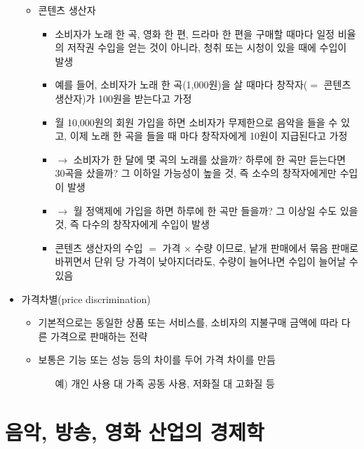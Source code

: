 \begin{itemize}
\begin{itemize}
	\item 콘텐츠 생산자
		\begin{itemize}
		\item 소비자가 노래 한 곡, 영화 한 편, 드라마 한 편을 구매할 때마다 일정 비율의 저작권 수입을 얻는 것이 아니라, 청취 또는 시청이 있을 때에 수입이 발생
		\item 예를 들어, 소비자가 노래 한 곡(1,000원)을 살 때마다 창작자($=$ 콘텐츠 생산자)가 100원을 받는다고 가정
		\item 월 10,000원의 회원 가입을 하면 소비자가 무제한으로 음악을 들을 수 있고, 이제 노래 한 곡을 들을 때 마다 창작자에게 10원이 지급된다고 가정
		\item $\rightarrow$ 소비자가 한 달에 몇 곡의 노래를 샀을까? 하루에 한 곡만 듣는다면 30곡을 샀을까? 그 이하일 가능성이 높을 것, 즉 소수의 창작자에게만 수입이 발생
		\item $\rightarrow$ 월 정액제에 가입을 하면 하루에 한 곡만 들을까? 그 이상일 수도 있을 것, 즉 다수의 창작자에게 수입이 발생
		\item 콘텐츠 생산자의 수입 $=$ 가격 $\times$ 수량 이므로, 낱개 판매에서 묶음 판매로 바뀌면서 단위 당 가격이 낮아지더라도, 수량이 늘어나면 수입이 늘어날 수 있음
		\end{itemize}
	\end{itemize}	
\item 가격차별(price discrimination)
	\begin{itemize}
	\item 기본적으로는 동일한 상품 또는 서비스를, 소비자의 지불구매 금액에 따라 다른 가격으로 판매하는 전략
	\item 보통은 기능 또는 성능 등의 차이를 두어 가격 차이를 만듬
		\begin{itemize}
		\item[예)] 개인 사용 대 가족 공동 사용, 저화질 대 고화질 등
		\end{itemize}
	\end{itemize}	
\end{itemize}

\section{음악, 방송, 영화 산업의 경제학}
